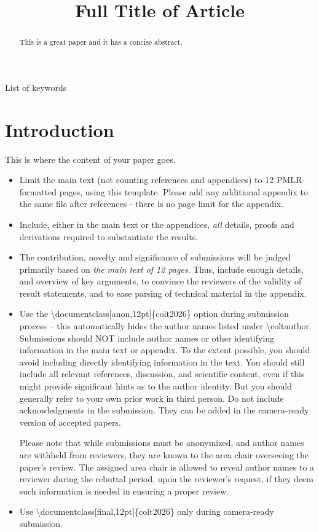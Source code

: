 \documentclass[anon,12pt]{colt2026} %
\title[Short Title]{Full Title of Article}
\begin{document}
\maketitle

\begin{abstract}%
  This is a great paper and it has a concise abstract.%
\end{abstract}

\begin{keywords}%
  List of keywords%
\end{keywords}

\section{Introduction}

This is where the content of your paper goes.
\begin{itemize}
  \item Limit the main text (not counting references and appendices) to 12 PMLR-formatted pages, using this template. Please add any additional appendix to the same file after references - there is no page limit for the appendix.
  \item Include, either in the main text or the appendices, \emph{all} details, proofs and derivations required to substantiate the results.
  \item The contribution, novelty and significance of submissions will be judged primarily based on
\textit{the main text of 12 pages}. Thus, include enough details, and overview of key arguments, 
to convince the reviewers of the validity of result statements, and to ease parsing of technical material in the appendix.
  \item Use the \textbackslash documentclass[anon,12pt]\{colt2026\} option during submission process -- this automatically hides the author names listed under \textbackslash coltauthor. Submissions should NOT include author names or other identifying information in the main text or appendix. To the extent possible, you should avoid including directly identifying information in the text. You should still include all relevant references, discussion, and scientific content, even if this might provide significant hints as to the author identity. But you should generally refer to your own prior work in third person. Do not include acknowledgments in the submission. They can be added in the camera-ready version of accepted papers. 
  
  Please note that while submissions must be anonymized, and author names are withheld from reviewers, they are known to the area chair overseeing the paper’s review.  The assigned area chair is allowed to reveal author names to a reviewer during the rebuttal period, upon the reviewer’s request, if they deem such information is needed in ensuring a proper review.  
  \item Use \textbackslash documentclass[final,12pt]\{colt2026\} only during camera-ready submission.
\end{itemize}
\end{document}
